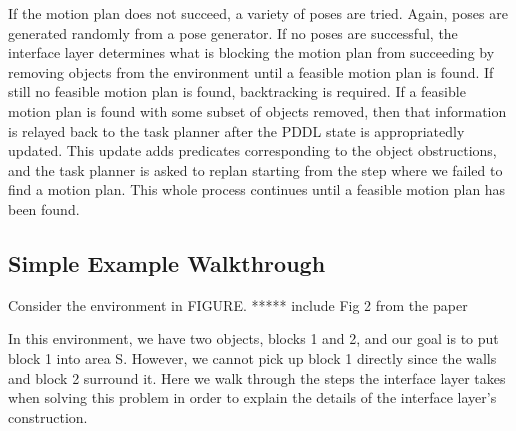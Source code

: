 \documentclass[12pt]{article}
\begin{document}
If the motion plan does not succeed, a variety of poses are tried.  
Again, poses are generated randomly from a pose generator.  
If no poses are successful, the interface layer determines what is blocking the motion plan from succeeding by removing objects from the environment until a feasible motion plan is found.  
If still no feasible motion plan is found, backtracking is required.  
If a feasible motion plan is found with some subset of objects removed, then that information is relayed back to the task planner after the PDDL state is appropriatedly updated.
This update adds predicates corresponding to the object obstructions, and the task planner is asked to replan starting from the step where we failed to find a motion plan. This whole process continues until a feasible motion plan has been found.  


\subsection{Simple Example Walkthrough}

Consider the environment in FIGURE.  ***** include Fig 2 from the paper

In this environment, we have two objects, blocks 1 and 2, and our goal is to put block 1 into area S.  
However, we cannot pick up block 1 directly since the walls and block 2 surround it.  
Here we walk through the steps the interface layer takes when solving this problem in order to explain the details of the interface layer's construction.
\end{document}
